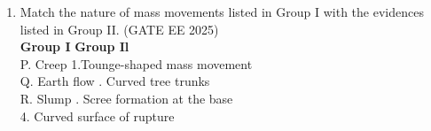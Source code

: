 \documentclass[journal]{IEEEtran}
\begin{document}
\begin{enumerate}[start=1]
\item Match the nature of mass movements listed in Group I with the evidences listed in Group II.
\hfill{(GATE EE 2025)}\\
\vspace{0.5cm}
\textbf{Group I} \hspace{3cm}
\textbf{Group Il}\\
P. Creep \qquad \qquad \qquad \qquad 1.Tounge-shaped mass movement\\
Q. Earth flow \qquad \qquad \quad {}. Curved tree trunks\\
R. Slump \qquad \qquad \qquad {}. Scree formation at the base\\
\hspace*{4.2cm} 4. Curved surface of rupture
\begin{enumerate}
\end{enumerate}


\end{enumerate}
\end{document}
